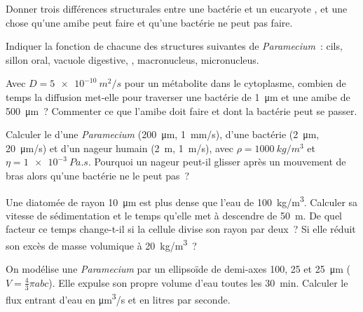 \begin{exercise}[$\star$]\label{exo:b2:unicellular-diversity:3}
Donner trois différences structurales entre une bactérie et un
eucaryote , et une chose qu'une amibe peut faire et
qu'une bactérie ne peut pas faire.
\end{exercise}

\begin{exercise}[$\star$]\label{exo:b2:unicellular-diversity:4}
Indiquer la fonction de chacune des structures suivantes de
\emph{Paramecium}~: cils, sillon oral, vacuole digestive, , macronucleus, micronucleus.
\end{exercise}

\begin{exercise}[$\star\star$]\label{exo:b2:unicellular-diversity:5}
Avec $D = \qty{5e-10}{m^2/s}$ pour un métabolite dans le cytoplasme,
combien de temps la diffusion met-elle pour traverser une bactérie de
\qty{1}{\micro m} et une amibe de \qty{500}{\micro m}~? Commenter ce que
l'amibe doit faire et dont la bactérie peut se passer.
\end{exercise}

\begin{exercise}[$\star\star$]\label{exo:b2:unicellular-diversity:6}
Calculer le  d'une \emph{Paramecium}
(\qty{200}{\micro m}, \qty{1}{mm/s}), d'une bactérie (\qty{2}{\micro m},
\qty{20}{\micro m/s}) et d'un nageur humain (\qty{2}{m}, \qty{1}{m/s}),
avec $\rho = \qty{1000}{kg/m^3}$ et $\eta = \qty{1e-3}{Pa.s}$. Pourquoi
un nageur peut-il glisser après un mouvement de bras alors qu'une
bactérie ne le peut pas~?
\end{exercise}

\begin{exercise}[$\star\star$]\label{exo:b2:unicellular-diversity:7}
Une diatomée de rayon \qty{10}{\micro m} est plus dense que l'eau de
\qty{100}{kg/m^3}. Calculer sa vitesse de sédimentation et le temps
qu'elle met à descendre de \qty{50}{m}. De quel facteur ce temps
change-t-il si la cellule divise son rayon par deux~? Si elle réduit
son excès de masse volumique à \qty{20}{kg/m^3}~?
\end{exercise}

\begin{exercise}[$\star\star$]\label{exo:b2:unicellular-diversity:8}
On modélise une \emph{Paramecium} par un ellipsoïde de demi-axes
\num{100}, \num{25} et \qty{25}{\micro m} ($V = \tfrac{4}{3}\pi abc$).
Elle expulse son propre volume d'eau toutes les \qty{30}{min}. Calculer
le flux entrant d'eau en \unit{\micro m^3/s} et en litres par seconde.
\end{exercise}

